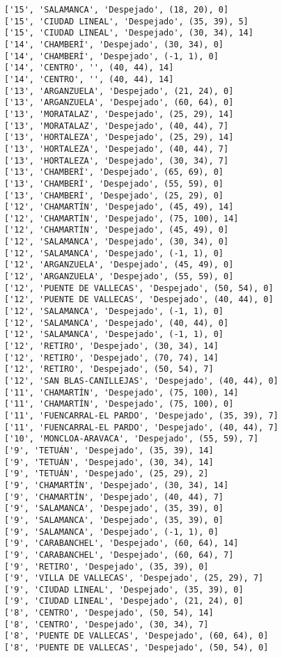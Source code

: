 \documentclass[11pt]{article}
\begin{document}
\begin{Verbatim}[commandchars=\\\{\}]
['15', 'SALAMANCA', 'Despejado', (18, 20), 0]
['15', 'CIUDAD LINEAL', 'Despejado', (35, 39), 5]
['15', 'CIUDAD LINEAL', 'Despejado', (30, 34), 14]
['14', 'CHAMBERÍ', 'Despejado', (30, 34), 0]
['14', 'CHAMBERÍ', 'Despejado', (-1, 1), 0]
['14', 'CENTRO', '', (40, 44), 14]
['14', 'CENTRO', '', (40, 44), 14]
['13', 'ARGANZUELA', 'Despejado', (21, 24), 0]
['13', 'ARGANZUELA', 'Despejado', (60, 64), 0]
['13', 'MORATALAZ', 'Despejado', (25, 29), 14]
['13', 'MORATALAZ', 'Despejado', (40, 44), 7]
['13', 'HORTALEZA', 'Despejado', (25, 29), 14]
['13', 'HORTALEZA', 'Despejado', (40, 44), 7]
['13', 'HORTALEZA', 'Despejado', (30, 34), 7]
['13', 'CHAMBERÍ', 'Despejado', (65, 69), 0]
['13', 'CHAMBERÍ', 'Despejado', (55, 59), 0]
['13', 'CHAMBERÍ', 'Despejado', (25, 29), 0]
['12', 'CHAMARTÍN', 'Despejado', (45, 49), 14]
['12', 'CHAMARTÍN', 'Despejado', (75, 100), 14]
['12', 'CHAMARTÍN', 'Despejado', (45, 49), 0]
['12', 'SALAMANCA', 'Despejado', (30, 34), 0]
['12', 'SALAMANCA', 'Despejado', (-1, 1), 0]
['12', 'ARGANZUELA', 'Despejado', (45, 49), 0]
['12', 'ARGANZUELA', 'Despejado', (55, 59), 0]
['12', 'PUENTE DE VALLECAS', 'Despejado', (50, 54), 0]
['12', 'PUENTE DE VALLECAS', 'Despejado', (40, 44), 0]
['12', 'SALAMANCA', 'Despejado', (-1, 1), 0]
['12', 'SALAMANCA', 'Despejado', (40, 44), 0]
['12', 'SALAMANCA', 'Despejado', (-1, 1), 0]
['12', 'RETIRO', 'Despejado', (30, 34), 14]
['12', 'RETIRO', 'Despejado', (70, 74), 14]
['12', 'RETIRO', 'Despejado', (50, 54), 7]
['12', 'SAN BLAS-CANILLEJAS', 'Despejado', (40, 44), 0]
['11', 'CHAMARTÍN', 'Despejado', (75, 100), 14]
['11', 'CHAMARTÍN', 'Despejado', (75, 100), 0]
['11', 'FUENCARRAL-EL PARDO', 'Despejado', (35, 39), 7]
['11', 'FUENCARRAL-EL PARDO', 'Despejado', (40, 44), 7]
['10', 'MONCLOA-ARAVACA', 'Despejado', (55, 59), 7]
['9', 'TETUÁN', 'Despejado', (35, 39), 14]
['9', 'TETUÁN', 'Despejado', (30, 34), 14]
['9', 'TETUÁN', 'Despejado', (25, 29), 2]
['9', 'CHAMARTÍN', 'Despejado', (30, 34), 14]
['9', 'CHAMARTÍN', 'Despejado', (40, 44), 7]
['9', 'SALAMANCA', 'Despejado', (35, 39), 0]
['9', 'SALAMANCA', 'Despejado', (35, 39), 0]
['9', 'SALAMANCA', 'Despejado', (-1, 1), 0]
['9', 'CARABANCHEL', 'Despejado', (60, 64), 14]
['9', 'CARABANCHEL', 'Despejado', (60, 64), 7]
['9', 'RETIRO', 'Despejado', (35, 39), 0]
['9', 'VILLA DE VALLECAS', 'Despejado', (25, 29), 7]
['9', 'CIUDAD LINEAL', 'Despejado', (35, 39), 0]
['9', 'CIUDAD LINEAL', 'Despejado', (21, 24), 0]
['8', 'CENTRO', 'Despejado', (50, 54), 14]
['8', 'CENTRO', 'Despejado', (30, 34), 7]
['8', 'PUENTE DE VALLECAS', 'Despejado', (60, 64), 0]
['8', 'PUENTE DE VALLECAS', 'Despejado', (50, 54), 0]

\end{Verbatim}
\end{document}
